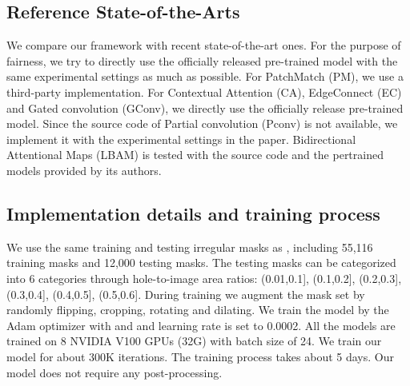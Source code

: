 \documentclass[journal]{IEEEtran}
\begin{document}
\subsection{Reference State-of-the-Arts}
We compare our framework with {\color{black}{8}} recent state-of-the-art ones. For the purpose of fairness, we try to directly use the officially released pre-trained model with the same experimental settings as much as possible. For PatchMatch \cite{barnes2009patchmatch} (PM), we use a third-party implementation. For Contextual Attention\cite{yu2018generative} (CA), EdgeConnect \cite{nazeri2019edgeconnect} (EC) and Gated convolution \cite{yu2019free} (GConv), we directly use the officially release pre-trained model. Since the source code of Partial convolution \cite{liu2018image} (Pconv) is not available, we implement it with the experimental settings in the paper. Bidirectional Attentional Maps \cite{chaohaoLBAM2019} (LBAM) is tested with the source code and the pertrained models provided by its authors. {}

\subsection{Implementation details and training process}
We use the same training and testing irregular masks as  \cite{liu2018image}, including 55,116 training masks and 12,000 testing masks. The testing masks can be categorized into 6 categories through hole-to-image area ratios: (0.01,0.1], (0.1,0.2], (0.2,0.3], (0.3,0.4], (0.4,0.5], (0.5,0.6].
During training we augment the mask set by randomly flipping, cropping, rotating and dilating.
We train the model by the Adam\cite{kingma2014adam} optimizer with  and  and learning rate is set to 0.0002. All the models are trained on 8 NVIDIA V100 GPUs (32G) with batch size of 24. We train our model for about 300K iterations. The training process takes about 5 days. {
}
Our model does not require any post-processing.
\end{document}
